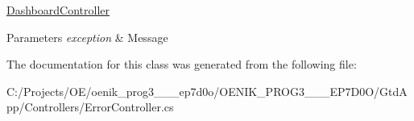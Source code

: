 \mbox{\hyperlink{class_gtd_app_1_1_console_1_1_controllers_1_1_dashboard_controller}{Dashboard\+Controller}} 


\begin{DoxyParams}{Parameters}
{\em exception} & Message\\
\hline
\end{DoxyParams}


The documentation for this class was generated from the following file\+:\begin{DoxyCompactItemize}
\item 
C\+:/\+Projects/\+O\+E/oenik\+\_\+prog3\+\_\+\_\+\_\+ep7d0o/\+O\+E\+N\+I\+K\+\_\+\+P\+R\+O\+G3\+\_\+\_\+\_\+\+E\+P7\+D0\+O/\+Gtd\+App/\+Controllers/Error\+Controller.\+cs\end{DoxyCompactItemize}
